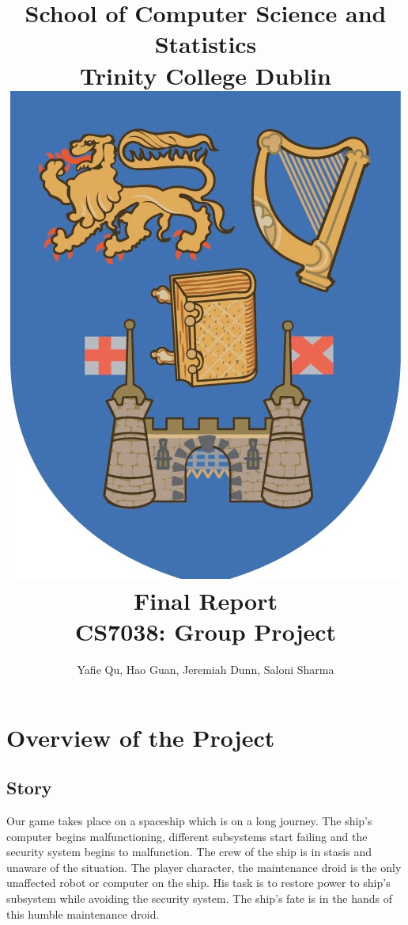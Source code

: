 \documentclass[11pt]{article}
\begin{document}
\title{School of Computer Science and Statistics \vspace{0.3cm}\\Trinity College Dublin\vspace{0.7cm}\\\includegraphics[scale=1.5]{TCD.jpg}\vspace{0.8cm}\\Final Report\vspace{0.3cm}\\CS7038: Group Project}
\author{Yafie Qu, Hao Guan, Jeremiah Dunn, Saloni Sharma}
\maketitle
\section{Overview of the Project}
\subsection{Story}
Our game takes place on a spaceship which is on a long journey. The ship's computer begins malfunctioning, different subsystems start failing and the security system begins to malfunction. The crew of the ship is in stasis and unaware of the situation. The player  character, the maintenance droid is the only unaffected robot or computer on the ship. His task is to restore power to ship's subsystem while avoiding the security system. The ship's fate is in the hands of this humble maintenance droid.
\end{document}
